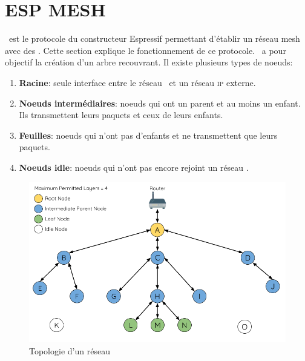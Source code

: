 \chapter{ESP MESH}
        \espmesh\ est le protocole du constructeur Espressif permettant d'établir un réseau mesh avec des \esp.
        Cette section explique le fonctionnement de ce protocole. \espmesh\ a pour objectif la création d'un arbre recouvrant.
        Il existe plusieurs types de noeuds:
        \begin{enumerate}
            \item \textbf{Racine}: seule interface entre le réseau \espmesh\ et un réseau \textsc{ip} externe.
            \item \textbf{Noeuds intermédiaires}: noeuds qui ont un parent et au moins un enfant.
            Ils transmettent leurs paquets et ceux de leurs enfants.
            \item \textbf{Feuilles}: noeuds qui n'ont pas d'enfants et ne transmettent que leurs paquets.
            \item \textbf{Noeuds idle}: noeuds qui n'ont pas encore rejoint un réseau \espmesh.
        \end{enumerate}

        \begin{figure}[H]
            \centering
            \includegraphics[scale=0.3]{images/mesh-node-types.png}
            \caption{Topologie d'un réseau \espmesh \cite{esp-mesh_w}}
        \end{figure}

